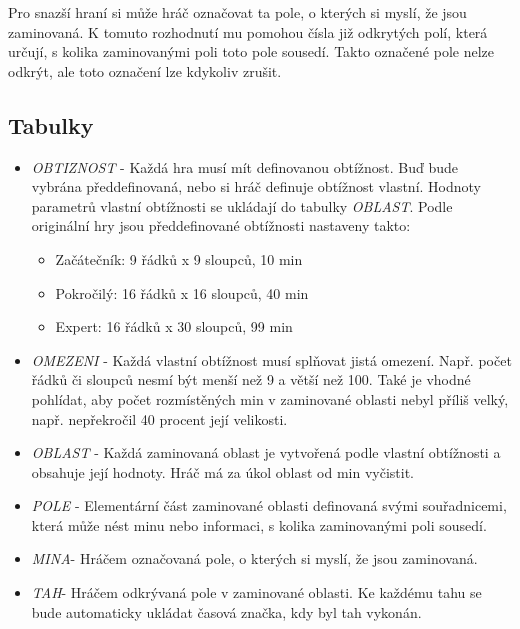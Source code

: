 \documentclass{article}
\begin{document}
Pro snazší hraní si může hráč označovat ta pole, o kterých si myslí, že jsou zaminovaná.
K tomuto rozhodnutí mu pomohou čísla již odkrytých polí, která určují, s kolika zaminovanými
poli toto pole sousedí. Takto označené pole nelze odkrýt, ale toto označení lze kdykoliv zrušit.

\subsection{Tabulky}
{\renewcommand\labelitemi{}
\begin{itemize}

    \item \textit{OBTIZNOST} - Každá hra musí mít definovanou obtížnost. Buď bude vybrána předdefinovaná,
        nebo si hráč definuje obtížnost vlastní. Hodnoty parametrů vlastní obtížnosti se
        ukládají do tabulky \textit{OBLAST}. Podle originální hry jsou předdefinované
        obtížnosti nastaveny takto:
        \begin{itemize}
            \item Začátečník: 9 řádků x 9 sloupců, 10 min
            \item Pokročilý: 16 řádků x 16 sloupců, 40 min
            \item Expert: 16 řádků x 30 sloupců, 99 min
        \end{itemize}
    
    \item \textit{OMEZENI} - Každá vlastní obtížnost musí splňovat jistá     
        omezení. Např. počet řádků či sloupců nesmí být menší než 9 a větší než 
        100. Také je vhodné pohlídat, aby
        počet rozmístěných min v zaminované oblasti nebyl příliš velký, např.
        nepřekročil 40 procent její velikosti.
    
    \item \textit{OBLAST} - Každá zaminovaná oblast je vytvořená podle vlastní 
        obtížnosti  a obsahuje její hodnoty. 
        Hráč má za úkol oblast od min vyčistit.
    
    \item \textit{POLE} - Elementární část zaminované oblasti definovaná svými 
        souřadnicemi, která může nést minu nebo informaci, 
        s kolika zaminovanými poli sousedí.
    
    \item \textit{MINA}-  Hráčem označovaná pole, o kterých si myslí, že jsou 
        zaminovaná.
    
    \item \textit{TAH}-  Hráčem odkrývaná pole v zaminované oblasti. 
        Ke každému tahu se bude automaticky ukládat časová značka, 
        kdy byl tah vykonán.
    

\end{itemize}}
\end{document}
